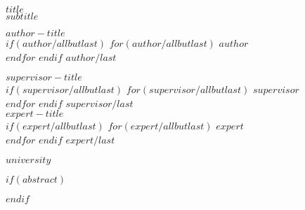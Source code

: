 
\begin{titlepage}
  \begin{center}
    \vspace*{5cm}
    
    {\textsf{\textbf{\Huge $title$}}}\\
    \vspace{0.3cm}
    \textsf{\textit{\large $subtitle$}}
    
    \vspace{1cm}
    \begin{multicols}{2}
      \begin{flushleft}
        \textsf{\textbf{$author-title$}\normalsize}\\
        $if(author/allbutlast)$
          $for(author/allbutlast)$
            \textsf{$author$}\\
          $endfor$
        $endif$
        \textsf{$author/last$}\\
      \end{flushleft}

      \vfill\null
      \columnbreak

      \begin{flushright}
        \textsf{\textbf{$supervisor-title$}\normalsize}\\
        $if(supervisor/allbutlast)$
          $for(supervisor/allbutlast)$
            \textsf{$supervisor$}\\
          $endfor$
        $endif$
        \textsf{$supervisor/last$}\\[0.4cm]

        \textsf{\textbf{$expert-title$}\normalsize}\\
        $if(expert/allbutlast)$
          $for(expert/allbutlast)$
            \textsf{$expert$}\\
          $endfor$
        $endif$
        \textsf{$expert/last$}

      \end{flushright}
    \end{multicols}
    \vfill
    \textsf{$university$}
  \end{center}
  \normalfont
\end{titlepage}

\restoregeometry

$if(abstract)$
\begin{abstract}
$abstract$
\end{abstract}
$endif$

